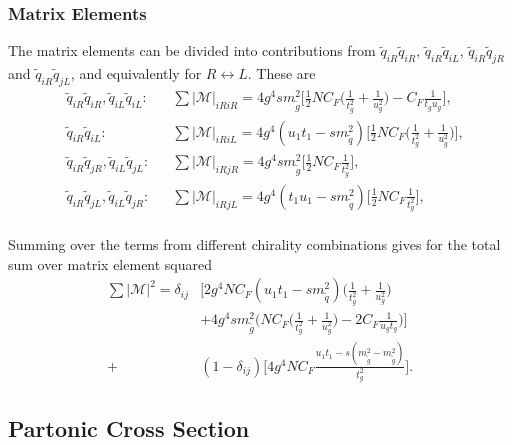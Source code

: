 \documentclass[twoside,english]{uiofysmaster}
\begin{document}
\subsubsection{Matrix Elements}\label{Sec:: susy hadron : Matrix Elements}

The matrix elements can be divided into contributions from $\tilde{q}_{iR} \tilde{q}_{iR}$, $\tilde{q}_{iR} \tilde{q}_{iL}$, $\tilde{q}_{iR} \tilde{q}_{jR}$ and $\tilde{q}_{iR} \tilde{q}_{jL}$, and equivalently for $R \leftrightarrow L$. These are
\begin{align}
&\tilde{q}_{iR} \tilde{q}_{iR}, \tilde{q}_{iL} \tilde{q}_{iL}: && \sum |\mathcal{M}|_{iRiR} = 4g^4 s m_{\tilde{g}}^2 \Big[ \frac{1}{2} NC_F\Big( \frac{1}{t_g^2} + \frac{1}{u_g^2} \Big) - C_F \frac{1}{t_gu_g} \Big],\\
&\tilde{q}_{iR} \tilde{q}_{iL}: &&\sum |\mathcal{M}|_{iRiL}=  4 g^4 (u_1t_1 - sm_{\tilde{q}}^2) \Big[ \frac{1}{2}NC_F \Big( \frac{1}{t_g^2} + \frac{1}{u_g^2} \Big) \Big],\\
& \tilde{q}_{iR} \tilde{q}_{jR}, \tilde{q}_{iL} \tilde{q}_{jL}: && \sum |\mathcal{M}|_{iRjR} = 4 g^4 sm_{\tilde{g}}^2 \Big[\frac{1}{2} NC_F \frac{1}{t_g^2}  \Big],\\
& \tilde{q}_{iR} \tilde{q}_{jL}, \tilde{q}_{iL} \tilde{q}_{jR}: && \sum |\mathcal{M}|_{iRjL} = 4 g^4 (t_1u_1 - sm_{\tilde{q}}^2) \Big[\frac{1}{2} NC_F \frac{1}{t_g^2}  \Big],\\
\end{align}

Summing over the terms from different chirality combinations gives  for the total sum over matrix element squared 
\begin{align}
\sum |\mathcal{M}|^2 = \delta_{ij} & \Bigg[2 g^4NC_F(u_1t_1-sm_{\tilde{q}}^2) \Big( \frac{1}{t_g^2} + \frac{1}{u_g^2} \Big) \nonumber \\& + 4 g^4 sm_{\tilde{g}}^2 \Big( NC_F \Big(\frac{1}{t_g^2} + \frac{1}{u_g^2}\Big) -2C_F\frac{1}{u_gt_g} \Big) \Bigg] \nonumber \\
+& (1-\delta_{ij})\Bigg[4g^4NC_F  \frac{u_1t_1-s(m_{\tilde{g}}^2-m_{\tilde{g}}^2)}{t_g^2} \Bigg].
\end{align}



\subsection*{Partonic Cross Section}
\end{document}
